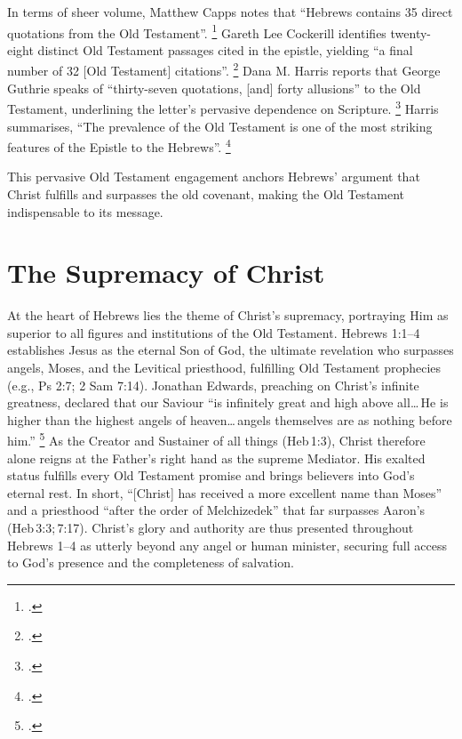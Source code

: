 \documentclass[12pt]{article}
\begin{document}
In terms of sheer volume, Matthew Capps notes that ``Hebrews contains 35 direct
quotations from the Old Testament''. \footcite[10]{Capps2015}
Gareth Lee Cockerill identifies twenty-eight distinct Old Testament passages
cited in the epistle, yielding ``a final number of 32 [Old Testament]
citations''. \footcite[14]{Cockerill2012}
Dana M. Harris reports that George Guthrie speaks of ``thirty-seven quotations,
[and] forty allusions'' to the Old Testament, underlining the letter’s
pervasive dependence on Scripture. \footcite[95]{Harris2021}
Harris summarises, ``The prevalence of the Old Testament is one of the most
striking features of the Epistle to the Hebrews''. \footcite[93]{Harris2021}

This pervasive Old Testament engagement anchors Hebrews’ argument that Christ
fulfills and surpasses the old covenant, making the Old Testament indispensable
to its message.

\section{The Supremacy of Christ}
At the heart of Hebrews lies the theme of Christ’s supremacy, portraying Him as
superior to all figures and institutions of the Old Testament. Hebrews 1:1--4
establishes Jesus as the eternal Son of God, the ultimate revelation who
surpasses angels, Moses, and the Levitical priesthood, fulfilling Old Testament
prophecies (e.g., Ps 2:7; 2 Sam 7:14).
Jonathan Edwards, preaching on Christ’s infinite greatness, declared that our
Saviour ``is infinitely great and high above all\ldots He is higher than the
highest angels of heaven\ldots angels themselves are as nothing before him.''
\footcite[103]{Edwards1981}
As the Creator and Sustainer of all things (Heb 1:3), Christ therefore alone
reigns at the Father’s right hand as the supreme Mediator.
His exalted status fulfills every Old Testament promise and brings believers
into God’s eternal rest.
In short, ``[Christ] has received a more excellent name than Moses'' and a
priesthood ``after the order of Melchizedek'' that far surpasses Aaron’s
(Heb 3:3; 7:17).
Christ’s glory and authority are thus presented throughout Hebrews 1--4 as
utterly beyond any angel or human minister, securing full access to God’s
presence and the completeness of salvation.
\end{document}

